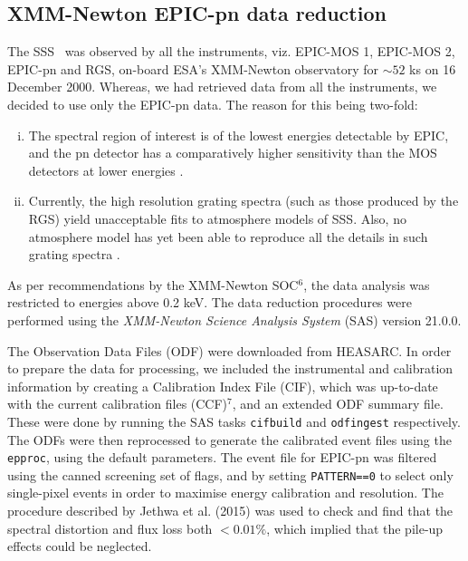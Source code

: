     \subsection{XMM-Newton EPIC-pn data reduction}
    	The SSS \source\ was observed by all the instruments, viz. EPIC-MOS 1, EPIC-MOS 2, EPIC-pn and RGS, on-board ESA's XMM-Newton observatory for $\sim 52$ ks on 16 December 2000. Whereas, we had retrieved data from all the instruments, we decided to use only the EPIC-pn data. The reason for this being two-fold:
    	\begin{enumerate}[i.]
    		\item The spectral region of interest is of the lowest energies detectable by EPIC, and the pn detector has a comparatively higher sensitivity than the MOS detectors at lower energies \cite{stecchini2023revisiting,mateos2009statistical}.
    		\item Currently, the high resolution grating spectra (such as those produced by the RGS) yield unacceptable fits to atmosphere models of SSS. Also, no atmosphere model has yet been able to reproduce all the details in such grating spectra \cite{ness2020complications}.
    	\end{enumerate}
    	As per recommendations by the XMM-Newton SOC$^6$, the data analysis was restricted to energies above 0.2 keV. The data reduction procedures were performed using the \textit{XMM-Newton Science Analysis System} (SAS) version 21.0.0.
    
    	The Observation Data Files (ODF) were downloaded from HEASARC. In order to prepare the data for processing, we included the instrumental and calibration information by creating a Calibration Index File (CIF), which was up-to-date with the current calibration files (CCF)$^7$, and an extended ODF summary file. These were done by running the SAS tasks \texttt{cifbuild} and \texttt{odfingest} respectively. The ODFs were then reprocessed to generate the calibrated event files using the \texttt{epproc}, using the default parameters. The event file for EPIC-pn was filtered using the canned screening set of flags, and by setting \texttt{PATTERN==0} to select only single-pixel events in order to maximise energy calibration and resolution. The procedure described by Jethwa et al. (2015) \cite{jethwa2015pile} was used to check and find that the spectral distortion and flux loss both $<0.01\%$, which implied that the pile-up effects could be neglected.
    
